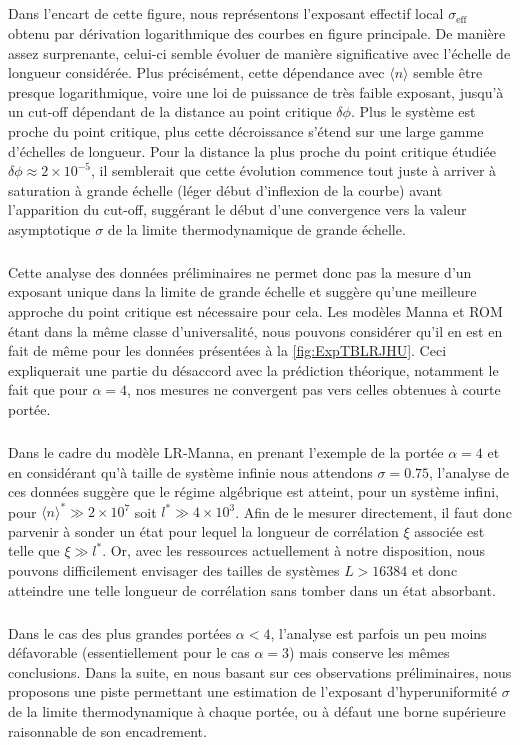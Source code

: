 \subparagraph{}Dans l'encart de cette figure, nous représentons l'exposant effectif local $\sigma_\text{eff}$ obtenu par dérivation logarithmique des courbes en figure principale. De manière assez surprenante, celui-ci semble évoluer de manière significative avec l'échelle de longueur considérée. Plus précisément, cette dépendance avec $\langle n \rangle$ semble être presque logarithmique, voire une loi de puissance de très faible exposant, jusqu'à un cut-off dépendant de la distance au point critique $\delta\phi$. Plus le système est proche du point critique, plus cette décroissance s'étend sur une large gamme d'échelles de longueur. Pour la distance la plus proche du point critique étudiée $\delta\phi\approx 2\times 10^{-5}$, il semblerait que cette évolution commence tout juste à arriver à saturation à grande échelle (léger début d'inflexion de la courbe) avant l'apparition du cut-off, suggérant le début d'une convergence vers la valeur asymptotique $\sigma$ de la limite thermodynamique de grande échelle.

\subparagraph{}Cette analyse des données préliminaires ne permet donc pas la mesure d'un exposant unique dans la limite de grande échelle et suggère qu'une meilleure approche du point critique est nécessaire pour cela. Les modèles Manna et ROM étant dans la même classe d'universalité, nous pouvons considérer qu'il en est en fait de même pour les données présentées à la \autoref{fig:ExpTBLRJHU}. Ceci expliquerait une partie du désaccord avec la prédiction théorique, notamment le fait que pour $\alpha=4$, nos mesures ne convergent pas vers celles obtenues à courte portée.

\subparagraph{}Dans le cadre du modèle LR-Manna, en prenant l'exemple de la portée $\alpha=4$ et en considérant qu'à taille de système infinie nous attendons $\sigma=0.75$, l'analyse de ces données suggère que le régime algébrique est atteint, pour un système infini, pour $\langle n \rangle^* \gg 2\times 10^7$ soit $l^* \gg 4\times 10^3$. Afin de le mesurer directement, il faut donc parvenir à sonder un état pour lequel la longueur de corrélation $\xi$ associée est telle que $\xi\gg l^*$. Or, avec les ressources actuellement à notre disposition, nous pouvons difficilement envisager des tailles de systèmes $L>16384$ et donc atteindre une telle longueur de corrélation sans tomber dans un état absorbant. 

\subparagraph{}Dans le cas des plus grandes portées $\alpha<4$, l'analyse est parfois un peu moins défavorable (essentiellement pour le cas $\alpha = 3$) mais conserve les mêmes conclusions. Dans la suite, en nous basant sur ces observations préliminaires, nous proposons une piste permettant une estimation de l'exposant d'hyperuniformité $\sigma$ de la limite thermodynamique à chaque portée, ou à défaut une borne supérieure raisonnable de son encadrement.

